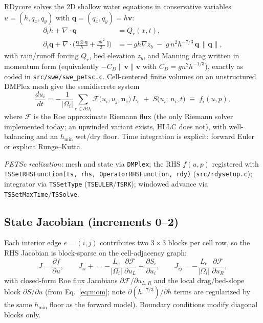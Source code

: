 \documentclass[11pt]{article}
\begin{document}
RDycore solves the 2D shallow water equations in conservative variables
$u = (h, q_x, q_y)$ with $\mathbf{q} = (q_x,q_y) = h\mathbf{v}$:
\begin{align}
  \partial_t h + \nabla\!\cdot\!\mathbf{q} &= Q_r(x,t),
  \label{eq:mass}\\
  \partial_t \mathbf{q}
    + \nabla\!\cdot\!\Big(\tfrac{\mathbf{q}\otimes\mathbf{q}}{h}
    + \tfrac{g h^2}{2}\,\mathbb{I}\Big)
  &= -\,g h \nabla z_b \;-\; g\, n^2 h^{-7/3}\,\mathbf{q}\,\lVert\mathbf{q}\rVert,
  \label{eq:mom}
\end{align}
with rain/runoff forcing $Q_r$, bed elevation $z_b$, and Manning drag
written in momentum form (equivalently $-C_D\lVert\mathbf{v}\rVert\mathbf{v}$
with $C_D = g n^2 h^{-1/3}$), exactly as coded in
\texttt{src/swe/swe\_petsc.c}. Cell-centered finite volumes on an
unstructured DMPlex mesh give the semidiscrete system
\begin{equation}
  \frac{du_i}{dt}
  = -\frac{1}{|\Omega_i|}\sum_{e \in \partial\Omega_i}
      \mathcal{F}\big(u_i, u_j, \mathbf{n}_e\big)\,L_e
    \;+\; S\big(u_i;\, n_i, t\big)
  \;\equiv\; f_i(u, p),
  \label{eq:semidiscrete}
\end{equation}
where $\mathcal{F}$ is the Roe approximate Riemann flux (the only
Riemann solver implemented today; an upwinded variant exists, HLLC does
not), with well-balancing and an $h_{\min}$ wet/dry floor. Time
integration is explicit: forward Euler or explicit Runge--Kutta.

\emph{PETSc realization:} mesh and state via \texttt{DMPlex}; the RHS
$f(u,p)$ registered with
\texttt{TSSetRHSFunction(ts, rhs, OperatorRHSFunction, rdy)}
(\texttt{src/rdysetup.c}); integrator via \texttt{TSSetType}
(\texttt{TSEULER}/\texttt{TSRK}); windowed advance via
\texttt{TSSetMaxTime}/\texttt{TSSolve}.

\subsection*{State Jacobian (increments 0--2)}

Each interior edge $e=(i,j)$ contributes two $3\times3$ blocks per cell
row, so the RHS Jacobian is block-sparse on the cell-adjacency graph:
\begin{equation}
  J = \frac{\partial f}{\partial u}, \qquad
  J_{ii} \mathrel{+}= -\frac{L_e}{|\Omega_i|}\,
     \frac{\partial \mathcal{F}}{\partial u_L}
     + \frac{\partial S_i}{\partial u_i}, \qquad
  J_{ij} = -\frac{L_e}{|\Omega_i|}\,
     \frac{\partial \mathcal{F}}{\partial u_R},
  \label{eq:jac}
\end{equation}
with closed-form Roe flux Jacobians $\partial\mathcal{F}/\partial u_{L,R}$
and the local drag/bed-slope block
$\partial S/\partial u$ (from Eq.~\ref{eq:mom}; note
$\partial(h^{-7/3})/\partial h$ terms are regularized by the same
$h_{\min}$ floor as the forward model). Boundary conditions modify
diagonal blocks only.
\end{document}

